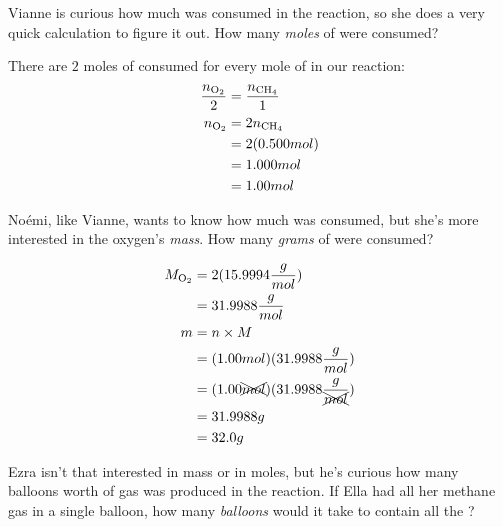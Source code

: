 \documentclass[11pt,addpoints]{exam}   	%
\begin{document}
\begin{questions}
\question[5] Vianne is curious how much  was consumed in the reaction, so she does a very quick calculation to figure it out.
How many \emph{moles} of  were consumed?

\begin{solution}
There are $2$ moles of  consumed for every mole of  in our reaction: \\

\begin{equation} 
\begin{split}
    \frac{n_{\ce{O2}}}{2} &= \frac{n_{\ce{CH4}}}{1} \\
    n_{\ce{O2}} &= 2 n_{\ce{CH4}} \\
                       &= 2 (0.500 mol ) \\
                       &= 1.000 mol \\
                       &= 1.00 mol
 \end{split}
 \end{equation}
\end{solution}


\question[5] No\'emi, like Vianne, wants to know how much  was consumed, but she's more interested in the oxygen's \emph{mass}. How many \emph{grams} of  were consumed?

\begin{solution}
\begin{equation} 
\begin{split}
    M_{\ce{O2}} &= 2 (15.9994 \frac{g}{mol}) \\
                        &= 31.9988 \frac{g}{mol} \\                        
    m &= n \times M \\
        &= (1.00 mol ) (31.9988 \frac{g}{mol}) \\
        &= (1.00 \xcancel{mol} ) (31.9988 \frac{g}{\xcancel{mol}}) \\
        &= 31.9988 g \\
        &= 32.0 g
 \end{split}
 \end{equation}
 \end{solution}


\question[5] Ezra isn't that interested in mass or in moles, but he's curious how many balloons worth of  gas was produced in the reaction.
If Ella had all her methane gas in a single balloon, how many \emph{balloons} would it take to contain all the ? 


\end{questions}
\end{document}

